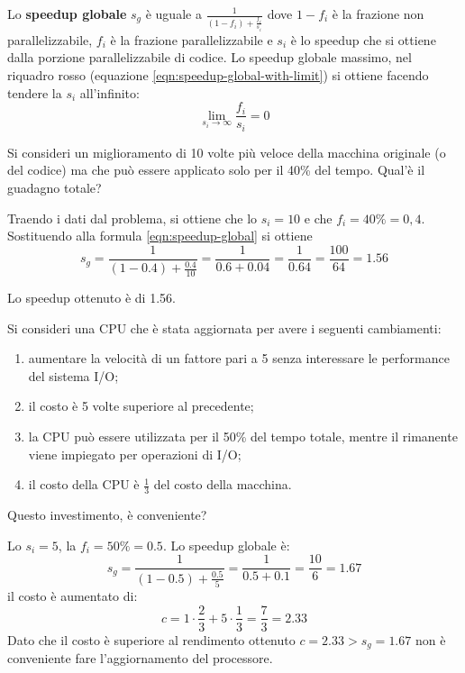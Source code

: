 Lo \textbf{speedup globale} $s_g$ è uguale a $ \frac{1}{(1-f_i)+\frac{f_i}{s_i}}$ dove $1-f_i$ è la frazione non parallelizzabile, $f_i$ è la frazione parallelizzabile e $s_i$ è lo speedup che si ottiene dalla porzione parallelizzabile di codice. Lo speedup globale massimo, nel riquadro rosso (equazione \ref{eqn:speedup-global-with-limit}) si ottiene facendo tendere la $s_i$ all'infinito: \[\lim_{s_i \to \infty}{\frac{f_i}{s_i}} = 0\]
\begin{exercise}
	Si consideri un miglioramento di 10 volte più veloce della macchina originale (o del codice) ma che può essere applicato solo per il 40\% del tempo. Qual'è il guadagno totale?
\end{exercise}
\begin{solution}
	Traendo i dati dal problema, si ottiene che lo $s_i = 10$ e che $f_i = 40\% = 0,4$. Sostituendo alla formula \ref{eqn:speedup-global} si ottiene
	\begin{equation*}
		s_g = \frac{1}{(1-0.4)+\frac{0.4}{10}} = \frac{1}{0.6+0.04} = \frac{1}{0.64} = \frac{100}{64} = 1.56
	\end{equation*}

	Lo speedup ottenuto è di 1.56.
\end{solution}

\begin{exercise}
	Si consideri una CPU che è stata aggiornata per avere i seguenti cambiamenti:
	\begin{enumerate}
		\item aumentare la velocità di un fattore pari a 5 senza interessare le performance del sistema I/O;
		\item il costo è 5 volte superiore al precedente;
		\item la CPU può essere utilizzata per il 50\% del tempo totale, mentre il rimanente viene impiegato per operazioni di I/O;
		\item il costo della CPU è $\frac{1}{3}$ del costo della macchina.
	\end{enumerate}
	Questo investimento, è conveniente?
\end{exercise}
\begin{solution}
	Lo $s_i = 5$, la $f_i = 50\% = 0.5$. Lo speedup globale è:
	\begin{equation*}
		s_g = \frac{1}{(1-0.5)+\frac{0.5}{5}}=\frac{1}{0.5+0.1} = \frac{10}{6} = 1.67
	\end{equation*}
	il costo è aumentato di:
	\begin{equation*}
		c = 1 \cdot \frac{2}{3} + 5 \cdot \frac{1}{3} =\frac{7}{3} = 2.33
	\end{equation*}
	Dato che il costo è superiore al rendimento ottenuto $ c = 2.33 >  s_g = 1.67 $ non è conveniente fare l'aggiornamento del processore.
\end{solution}

